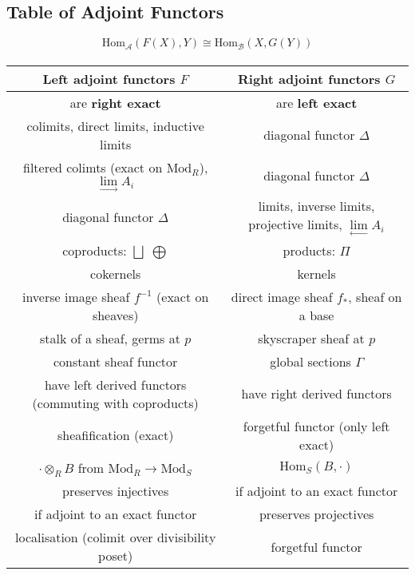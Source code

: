 \documentclass[10pt]{article}
\newcommand{\scr}[1]{\mathcal{#1}}
\newcommand{\Hom}{\mathrm{Hom}}
\newcommand{\Mod}{\mathrm{Mod}}
\begin{document}
\begin{center}
\section*{Table of Adjoint Functors}
\end{center}

\begin{equation*}
\Hom_{\scr{A}}(F(X), Y) \cong \Hom_{\scr{B}}(X, G(Y))
\end{equation*}
\paragraph{}

\begin{center}
\begin{tabular}{|c| c|}
\hline
\textbf{Left adjoint functors $F$} & \textbf{Right adjoint functors $G$} \\
\hline
are \textbf{right exact} & are \textbf{left exact} \\
colimits, direct limits, inductive limits & diagonal functor $\Delta$ \\
filtered colimts (exact on $\mathrm{Mod}_R$),  $\lim\limits_{\longrightarrow}A_i $ & diagonal functor $\Delta$ \\
diagonal functor $\Delta$ & limits, inverse limits, projective limits, $\lim\limits_{\longleftarrow} A_i$ \\
coproducts: $\bigsqcup$ $\bigoplus$ & products: $\Pi$ \\ 
cokernels & kernels \\
inverse image sheaf $f^{-1}$ (exact on sheaves) & direct image sheaf $f_{*}$, sheaf on a base \\
stalk of a sheaf, germs at $p$ & skyscraper sheaf at $p$ \\
constant sheaf functor & global sections $\Gamma$ \\
have left derived functors (commuting with coproducts) & have right derived functors \\
sheafification (exact) & forgetful functor (only left exact) \\
$\cdot \otimes_{R} B$ from $\Mod_{R} \to \Mod_{S}$ & $\Hom_{S}(B, \cdot)$ \\
preserves injectives & if adjoint to an exact functor \\
if adjoint to an exact functor & preserves projectives\\
localisation (colimit over divisibility poset) &  forgetful functor  \\

\end{tabular}
\end{center}
\end{document}
